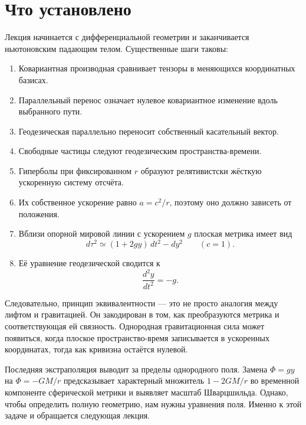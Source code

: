 \section{Что установлено}

Лекция начинается с дифференциальной геометрии и заканчивается ньютоновским падающим телом. Существенные шаги таковы:
\begin{enumerate}
\item Ковариантная производная сравнивает тензоры в меняющихся координатных базисах.
\item Параллельный перенос означает нулевое ковариантное изменение вдоль выбранного пути.
\item Геодезическая параллельно переносит собственный касательный вектор.
\item Свободные частицы следуют геодезическим пространства-времени.
\item Гиперболы при фиксированном \(r\) образуют релятивистски жёсткую ускоренную систему отсчёта.
\item Их собственное ускорение равно \(a=c^2/r\), поэтому оно должно зависеть от положения.
\item Вблизи опорной мировой линии с ускорением \(g\) плоская метрика имеет вид
\begin{equation}
d\tau^2\simeq(1+2gy)\,dt^2-dy^2
\qquad(c=1).
\end{equation}
\item Её уравнение геодезической сводится к
\begin{equation}
\frac{d^2y}{dt^2}=-g.
\end{equation}
\end{enumerate}

Следовательно, принцип эквивалентности — это не просто аналогия между лифтом и гравитацией. Он закодирован в том, как преобразуются метрика и соответствующая ей связность. Однородная гравитационная сила может появиться, когда плоское пространство-время записывается в ускоренных координатах, тогда как кривизна остаётся нулевой.

Последняя экстраполяция выводит за пределы однородного поля. Замена \(\Phi=gy\) на \(\Phi=-GM/r\) предсказывает характерный множитель \(1-2GM/r\) во временной компоненте сферической метрики и выявляет масштаб Шварцшильда. Однако, чтобы определить полную геометрию, нам нужны уравнения поля. Именно к этой задаче и обращается следующая лекция.
